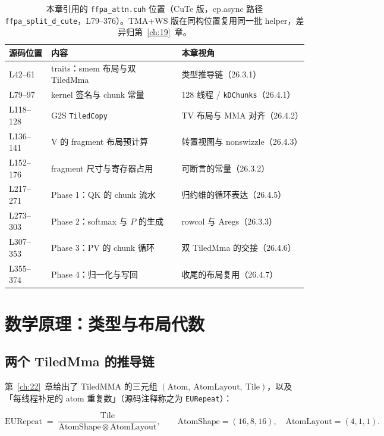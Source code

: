 \begin{table}[htbp]
\centering
\caption{本章引用的 \texttt{ffpa\_\allowbreak{}attn.\allowbreak{}cuh} 位置（CuTe 版，cp.async 路径
\texttt{ffpa\_\allowbreak{}split\_\allowbreak{}d\_\allowbreak{}cute}，L79--376）。TMA+WS 版在同构位置复用同一批
helper，差异归第~\ref{ch:19}~章。}
\label{tab:26-code}
\begin{tabular}{p{4.2cm}p{3.4cm}p{6.0cm}}
\toprule
源码位置 & 内容 & 本章视角 \\
\midrule
L42--61 & traits：smem 布局与双 TiledMma & 类型推导链（26.3.1） \\
L79--97 & kernel 签名与 chunk 常量 & 128 线程 / \texttt{kDChunks}（26.4.1） \\
L118--128 & G2S \texttt{TiledCopy} & TV 布局与 MMA 对齐（26.4.2） \\
L136--141 & V 的 fragment 布局预计算 & 转置视图与 nonswizzle（26.4.3） \\
L152--176 & fragment 尺寸与寄存器占用 & 可断言的常量（26.3.2） \\
L217--271 & Phase 1：QK 的 chunk 流水 & 归约维的循环表达（26.4.5） \\
L273--303 & Phase 2：softmax 与 $P$ 的生成 & rowcol 与 Aregs（26.3.3） \\
L307--353 & Phase 3：PV 的 chunk 循环 & 双 TiledMma 的交接（26.4.6） \\
L355--374 & Phase 4：归一化与写回 & 收尾的布局复用（26.4.7） \\
\bottomrule
\end{tabular}
\end{table}

\section{数学原理：类型与布局代数}

\subsection{两个 TiledMma 的推导链}

第~\ref{ch:22}~章给出了 TiledMMA 的三元组
$(\mathrm{Atom},\ \mathrm{AtomLayout},\ \mathrm{Tile})$，以及「每线程补足的
atom 重复数」（源码注释称之为 \texttt{EURepeat}）：

\begin{equation}
  \mathrm{EURepeat} \;=\; \frac{\mathrm{Tile}}
  {\mathrm{AtomShape}\otimes \mathrm{AtomLayout}} ,
  \qquad
  \mathrm{AtomShape} = (16,8,16),\quad \mathrm{AtomLayout} = (4,1,1).
  \label{eq:26-eurepeat}
\end{equation}

